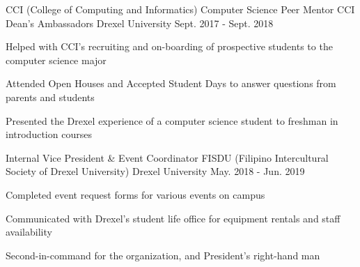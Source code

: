 \begin{cventries}
  \cventry
    {CCI (College of Computing and Informatics) Computer Science Peer Mentor} %
    {CCI Dean's Ambassadors} %
    {Drexel University} %
    {Sept. 2017 - Sept. 2018} %
    {
      \begin{cvitems} %
        \item Helped with CCI's recruiting and on-boarding of prospective students to the computer science major
        \item Attended Open Houses and Accepted Student Days to answer questions from parents and students
        \item Presented the Drexel experience of a computer science student to freshman in introduction courses
      \end{cvitems}
    }

  \cventry
    {Internal Vice President \& Event Coordinator} %
    {FISDU (Filipino Intercultural Society of Drexel University)} %
    {Drexel University} %
    {May. 2018 - Jun. 2019} %
    {
      \begin{cvitems} %
        \item Completed event request forms for various events on campus
        \item Communicated with Drexel's student life office for equipment rentals and staff availability
        \item Second-in-command for the organization, and President's right-hand man
      \end{cvitems}
    }


\end{cventries}
